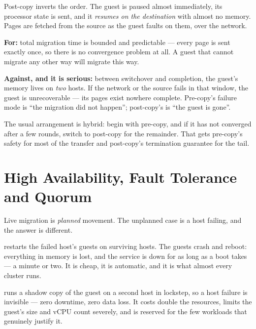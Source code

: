 \begin{conceptbox}
Post-copy inverts the order. The guest is paused almost immediately, its
processor state is sent, and it \emph{resumes on the destination} with almost
no memory. Pages are fetched from the source as the guest faults on them, over
the network.

\smallskip
\textbf{For:} total migration time is bounded and predictable --- every page is
sent exactly once, so there is no convergence problem at all. A guest that
cannot migrate any other way will migrate this way.

\smallskip
\textbf{Against, and it is serious:} between switchover and completion, the
guest's memory lives on \emph{two} hosts. If the network or the source fails in
that window, the guest is unrecoverable --- its pages exist nowhere complete.
Pre-copy's failure mode is ``the migration did not happen''; post-copy's is
``the guest is gone''.

\smallskip
The usual arrangement is hybrid: begin with pre-copy, and if it has not
converged after a few rounds, switch to post-copy for the remainder. That gets
pre-copy's safety for most of the transfer and post-copy's termination
guarantee for the tail.
\end{conceptbox}

\section{High Availability, Fault Tolerance and Quorum}

Live migration is \emph{planned} movement. The unplanned case is a host
failing, and the answer is different.

 restarts the failed host's guests on surviving hosts.
The guests crash and reboot: everything in memory is lost, and the service is
down for as long as a boot takes --- a minute or two. It is cheap, it is
automatic, and it is what almost every cluster runs.

 runs a shadow copy of the guest on a second host in
lockstep, so a host failure is invisible --- zero downtime, zero data loss. It
costs double the resources, limits the guest's size and vCPU count severely,
and is reserved for the few workloads that genuinely justify it.

